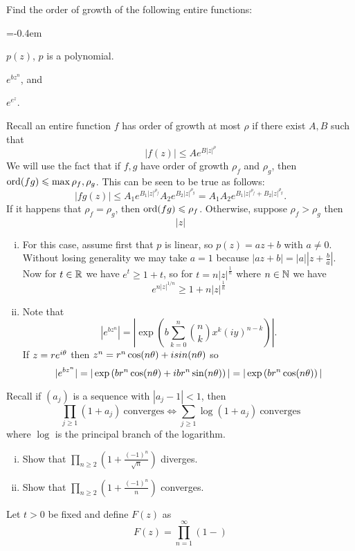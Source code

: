 \documentclass[12pt]{memoir}
\begin{document}
\begin{Ej}
    Find the order of growth of the following entire functions:
    \begin{enumerate}[i)]
        \itemsep=-0.4em
        \begin{multicols}{3}
        \item $p(z)$, $p$ is a polynomial.
        \item $e^{bz^n}$, and
        \item $e^{e^z}$.
        \end{multicols}
    \end{enumerate}
\end{Ej}

\begin{ptcbr}
    Recall an entire function $f$ has order of growth at most $\rho$ if there exist $A,B$ such that 
    $$|f(z)|\leq Ae^{B|z|^\rho}$$
    We will use the fact that if $f,g$ have order of growth $\rho_f$ and $\rho_g$, then $\operatorname{ord}(fg)\leqslant\max{\rho_f,\rho_g}$. This can be seen to be true as follows:
    $$|fg(z)|\leq A_1e^{B_1|z|^{\rho_f}}A_2e^{B_2|z|^{\rho_g}}=A_1A_2e^{B_1|z|^{\rho_f}+B_2|z|^{\rho_g}}.$$
    If it happens that $\rho_f=\rho_g$, then $\operatorname{ord}(fg)\leqslant\rho_f$. Otherwise, suppose $\rho_f>\rho_g$ then 
    $$|z|$$
    \begin{enumerate}[i)]
        \itemsep=-0.4em
        \item For this case, assume first that $p$ is linear, so $p(z)=az+b$ with $a\neq 0$. Without losing generality we may take $a=1$ because $|az+b|=|a|\left|z+\frac{b}{a}\right|$. Now for $t\in\mathbb{R}$ we have $e^{t}\geq 1+t$, so for $t=n|z|^{\frac{1}{n}}$ where $n\in\mathbb{N}$ we have 
        $$e^{n|z|^{1/n}}\geq 1+n|z|^{\frac{1}{n}}$$
        \item Note that 
        $$|e^{bz^n}|=\left|\exp\left(b\sum_{k=0}^n\binom{n}{k}x^k(iy)^{n-k}\right)\right|.$$
        If $z=re^{i\theta}$ then $z^n=r^n\cos(n\theta)+isin(n\theta)$ so
        $$|e^{bz^n}|=|\exp\left(br^n\cos(n\theta)+ibr^n\sin(n\theta)\right)|=|\exp\left(br^n\cos(n\theta)\right)|$$ 
    \end{enumerate}
\end{ptcbr}


\begin{Ej}
    Recall if $(a_j)$ is a sequence with $|a_j-1|<1$, then 
    $$\prod_{j\geq 1}(1+a_j)\ \text{converges}\iff\sum_{j\geq 1}\log(1+a_j)\ \text{converges}$$
    where $\log$ is the principal branch of the logarithm.
    \begin{enumerate}[i)]
        \itemsep=-0.4em
        \item Show that $\prod_{n\geq 2}\left(1+\frac{(-1)^n}{\sqrt{n}}\right)$ diverges.
        \item Show that $\prod_{n\geq 2}\left(1+\frac{(-1)^n}{n}\right)$ converges.
    \end{enumerate}
    \end{Ej}

\begin{ptcbr}
    
\end{ptcbr}

\begin{Ej}
    Let $t>0$ be fixed and define $F(z)$ as 
    $$F(z)=\prod_{n=1}^{\infty}\left(1-\right)$$
    \end{Ej}

\begin{ptcbr}
    
\end{ptcbr}
\end{document}

